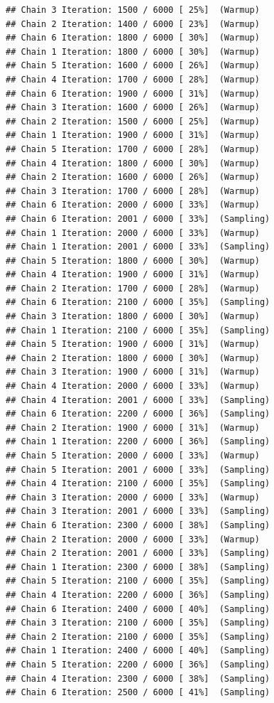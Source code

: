 \documentclass[
]{article}
\begin{document}
\begin{verbatim}
## Chain 3 Iteration: 1500 / 6000 [ 25%]  (Warmup) 
## Chain 2 Iteration: 1400 / 6000 [ 23%]  (Warmup) 
## Chain 6 Iteration: 1800 / 6000 [ 30%]  (Warmup) 
## Chain 1 Iteration: 1800 / 6000 [ 30%]  (Warmup) 
## Chain 5 Iteration: 1600 / 6000 [ 26%]  (Warmup) 
## Chain 4 Iteration: 1700 / 6000 [ 28%]  (Warmup) 
## Chain 6 Iteration: 1900 / 6000 [ 31%]  (Warmup) 
## Chain 3 Iteration: 1600 / 6000 [ 26%]  (Warmup) 
## Chain 2 Iteration: 1500 / 6000 [ 25%]  (Warmup) 
## Chain 1 Iteration: 1900 / 6000 [ 31%]  (Warmup) 
## Chain 5 Iteration: 1700 / 6000 [ 28%]  (Warmup) 
## Chain 4 Iteration: 1800 / 6000 [ 30%]  (Warmup) 
## Chain 2 Iteration: 1600 / 6000 [ 26%]  (Warmup) 
## Chain 3 Iteration: 1700 / 6000 [ 28%]  (Warmup) 
## Chain 6 Iteration: 2000 / 6000 [ 33%]  (Warmup) 
## Chain 6 Iteration: 2001 / 6000 [ 33%]  (Sampling) 
## Chain 1 Iteration: 2000 / 6000 [ 33%]  (Warmup) 
## Chain 1 Iteration: 2001 / 6000 [ 33%]  (Sampling) 
## Chain 5 Iteration: 1800 / 6000 [ 30%]  (Warmup) 
## Chain 4 Iteration: 1900 / 6000 [ 31%]  (Warmup) 
## Chain 2 Iteration: 1700 / 6000 [ 28%]  (Warmup) 
## Chain 6 Iteration: 2100 / 6000 [ 35%]  (Sampling) 
## Chain 3 Iteration: 1800 / 6000 [ 30%]  (Warmup) 
## Chain 1 Iteration: 2100 / 6000 [ 35%]  (Sampling) 
## Chain 5 Iteration: 1900 / 6000 [ 31%]  (Warmup) 
## Chain 2 Iteration: 1800 / 6000 [ 30%]  (Warmup) 
## Chain 3 Iteration: 1900 / 6000 [ 31%]  (Warmup) 
## Chain 4 Iteration: 2000 / 6000 [ 33%]  (Warmup) 
## Chain 4 Iteration: 2001 / 6000 [ 33%]  (Sampling) 
## Chain 6 Iteration: 2200 / 6000 [ 36%]  (Sampling) 
## Chain 2 Iteration: 1900 / 6000 [ 31%]  (Warmup) 
## Chain 1 Iteration: 2200 / 6000 [ 36%]  (Sampling) 
## Chain 5 Iteration: 2000 / 6000 [ 33%]  (Warmup) 
## Chain 5 Iteration: 2001 / 6000 [ 33%]  (Sampling) 
## Chain 4 Iteration: 2100 / 6000 [ 35%]  (Sampling) 
## Chain 3 Iteration: 2000 / 6000 [ 33%]  (Warmup) 
## Chain 3 Iteration: 2001 / 6000 [ 33%]  (Sampling) 
## Chain 6 Iteration: 2300 / 6000 [ 38%]  (Sampling) 
## Chain 2 Iteration: 2000 / 6000 [ 33%]  (Warmup) 
## Chain 2 Iteration: 2001 / 6000 [ 33%]  (Sampling) 
## Chain 1 Iteration: 2300 / 6000 [ 38%]  (Sampling) 
## Chain 5 Iteration: 2100 / 6000 [ 35%]  (Sampling) 
## Chain 4 Iteration: 2200 / 6000 [ 36%]  (Sampling) 
## Chain 6 Iteration: 2400 / 6000 [ 40%]  (Sampling) 
## Chain 3 Iteration: 2100 / 6000 [ 35%]  (Sampling) 
## Chain 2 Iteration: 2100 / 6000 [ 35%]  (Sampling) 
## Chain 1 Iteration: 2400 / 6000 [ 40%]  (Sampling) 
## Chain 5 Iteration: 2200 / 6000 [ 36%]  (Sampling) 
## Chain 4 Iteration: 2300 / 6000 [ 38%]  (Sampling) 
## Chain 6 Iteration: 2500 / 6000 [ 41%]  (Sampling) 

\end{verbatim}
\end{document}
